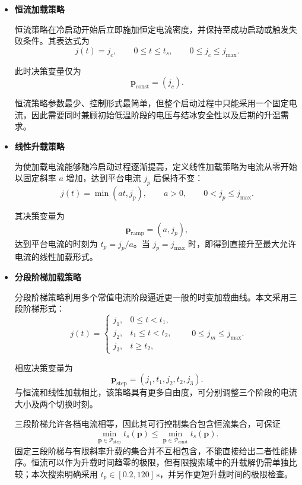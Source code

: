 \documentclass[bwprint]{gmcmthesis}
\numberwithin{equation}{section}
\numberwithin{figure}{section}
\begin{document}
\begin{itemize}
\renewcommand{\labelitemi}{$\blacktriangleright$}
\item \textbf {恒流加载策略}

 恒流策略在冷启动开始后立即施加恒定电流密度，并保持至成功启动或触发失败条件。其表达式为
\begin{equation}
j(t) = j_c, \qquad 0 \leq t \leq t_s, \qquad 0 \leq j_c \leq j_{\text{max}}. \label{eq:src:5-51}
\end{equation}

 此时决策变量仅为
\[
\mathbf{p}_{\text{const}} = (j_c).
\]

 恒流策略参数最少、控制形式最简单，但整个启动过程中只能采用一个固定电流，因此需要同时兼顾初始低温阶段的电压与结冰安全性以及后期的升温需求。


\item \textbf {线性升载策略}

 为使加载电流能够随冷启动过程逐渐提高，定义线性加载策略为电流从零开始以固定斜率 \(a\) 增加，达到平台电流 \(j_p\) 后保持不变：
\begin{equation}
j(t) = \min(at, j_p), \qquad a > 0, \qquad 0 < j_p \leq j_{\text{max}}. \label{eq:src:5-52}
\end{equation}

 其决策变量为
\[
\mathbf{p}_{\text{ramp}} = (a, j_p),
\]
达到平台电流的时刻为 \(t_p = j_p / a\)。当 \(j_p = j_{\text{max}}\) 时，即得到直接升至最大允许电流的线性加载形式。

\item \textbf {分段阶梯加载策略}

 分段阶梯策略利用多个常值电流阶段逼近更一般的时变加载曲线\cite{lei2022loading}。本文采用三段阶梯形式：
\begin{equation}
j(t) = \begin{cases}
j_1, & 0 \leq t < t_1, \\
j_2, & t_1 \leq t < t_2, \\
j_3, & t \geq t_2,
\end{cases} \qquad 0 \leq j_m \leq j_{\text{max}}. \label{eq:src:5-53}
\end{equation}

 相应决策变量为
\[
\mathbf{p}_{\text{step}} = (j_1, t_1, j_2, t_2, j_3).
\]
与恒流和线性加载相比，该策略具有更多自由度，可分别调整三个阶段的电流大小及两个切换时刻。

三段阶梯允许各档电流相等，因此其可行控制集合包含恒流集合，可保证
\begin{equation}
\min_{\mathbf p\in\mathcal P_{\mathrm{step}}}t_s(\mathbf p)\leq\min_{\mathbf p\in\mathcal P_{\mathrm{const}}}t_s(\mathbf p).\label{eq:src:5-54}
\end{equation}
固定三段阶梯与有限斜率升载的集合并不互相包含，不能直接给出二者性能排序。恒流可以作为升载时间趋零的极限，但有限搜索域中的升载解仍需单独比较；本次搜索明确采用 $t_p\in[0.2,120]\,\mathrm s$，并另作更短升载时间的极限检查。

\end{itemize}
\end{document}
